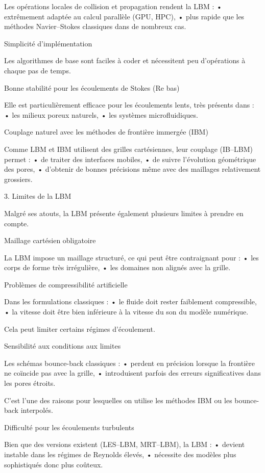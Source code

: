 \documentclass[12pt,a4paper]{report}
\begin{document}
Les opérations locales de collision et propagation rendent la LBM :
	•	extrêmement adaptée au calcul parallèle (GPU, HPC),
	•	plus rapide que les méthodes Navier–Stokes classiques dans de nombreux cas.

 Simplicité d’implémentation

Les algorithmes de base sont faciles à coder et nécessitent peu d’opérations à chaque pas de temps.

 Bonne stabilité pour les écoulements de Stokes (Re bas)

Elle est particulièrement efficace pour les écoulements lents, très présents dans :
	•	les milieux poreux naturels,
	•	les systèmes microfluidiques.

 Couplage naturel avec les méthodes de frontière immergée (IBM)

Comme LBM et IBM utilisent des grilles cartésiennes, leur couplage (IB–LBM) permet :
	•	de traiter des interfaces mobiles,
	•	de suivre l’évolution géométrique des pores,
	•	d’obtenir de bonnes précisions même avec des maillages relativement grossiers.



3. Limites de la LBM

Malgré ses atouts, la LBM présente également plusieurs limites à prendre en compte.

 Maillage cartésien obligatoire

La LBM impose un maillage structuré, ce qui peut être contraignant pour :
	•	les corps de forme très irrégulière,
	•	les domaines non alignés avec la grille.

 Problèmes de compressibilité artificielle

Dans les formulations classiques :
	•	le fluide doit rester faiblement compressible,
	•	la vitesse doit être bien inférieure à la vitesse du son du modèle numérique.

Cela peut limiter certains régimes d’écoulement.

Sensibilité aux conditions aux limites

Les schémas bounce-back classiques :
	•	perdent en précision lorsque la frontière ne coïncide pas avec la grille,
	•	introduisent parfois des erreurs significatives dans les pores étroits.

C’est l’une des raisons pour lesquelles on utilise les méthodes IBM ou les bounce-back interpolés.

 Difficulté pour les écoulements turbulents

Bien que des versions existent (LES–LBM, MRT–LBM), la LBM :
	•	devient instable dans les régimes de Reynolds élevés,
	•	nécessite des modèles plus sophistiqués donc plus coûteux.
\end{document}
